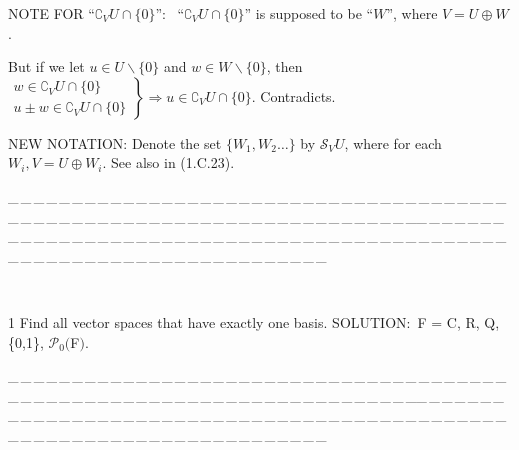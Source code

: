 \documentclass[a4paper, 11pt, UTF8]{article}
\def\Po{\mathcal{P}}
\begin{document}
\begin{large}
{\timesbf\Large N{\normalsize OTE} F{\normalsize OR} $“\complement_V U \cap \{0\}”$:}\,\,\,
$“\complement_V U \cap \{0\}”$ is supposed to be “$W$”, where $V=U\oplus W$.\par\quad
But if we let $u\in U\backslash\{0\}$ and $w\in W\backslash\{0\}$, then $\left.\begin{array}{l} w\in\complement_V U \cap \{0\}\\ u\pm w\in\complement_V U \cap \{0\} \end{array}\right\}\Rightarrow u\in\complement_V U \cap \{0\}.$ Contradicts.\par
{\timesbf\Large N{\normalsize EW} N{\normalsize OTATION:}} {\Large Denote the set $\{W_1,W_2\dots\}$ by $\mathcal{S}_V U$,} {\small where for each $W_i,V=U\oplus W_i$. See also in (1.C.23).}\par{\tiny \_\,\_\,\_\,\_\,\_\,\_\,\_\,\_\,\_\,\_\,\_\,\_\,\_\,\_\,\_\,\_\,\_\,\_\,\_\,\_\,\_\,\_\,\_\,\_\,\_\,\_\,\_\,\_\,\_\,\_\,\_\,\_\,\_\,\_\,\_\,\_\,\_\,\_\,\_\,\_\,\_\,\_\,\_\,\_\,\_\,\_\,\_\,\_\,\_\,\_\,\_\,\_\,\_\,\_\,\_\,\_\,\_\,\_\,\_\,\_\,\_\,\_\,\_\,\_\,\_\,\_\,\_\,\_\,\_\,\_\,\_\_\,\_\,\_\,\_\,\_\,\_\,\_\,\_\,\_\,\_\,\_\,\_\,\_\,\_\,\_\,\_\,\_\,\_\,\_\,\_\,\_\,\_\,\_\,\_\,\_\,\_\,\_\,\_\,\_\,\_\,\_\,\_\,\_\,\_\,\_\,\_\,\_\,\_\,\_\,\_\,\_\,\_\,\_\,\_\,\_\,\_\,\_\,\_\,\_\,\_\,\_\,\_\,\_\,\_\,\_\,\_\,\_\,\_\,\_\,\_\,\_\,\_\,\_\,\_\,\_\,\_\,\_\,\_\,\_\,\_\,\_}{\tiny\,\par}

{\timesbf\Large 1} {\timessl\Large 
Find all vector spaces that have exactly one basis.
}
{\timesbf S\footnotesize{OLUTION:}}\,\,\,{\timesbf F} = {\timesbf C, R, Q},\{0,1\}, $\Po_0(${\timesbf F}$)$.\par
{\tiny \_\,\_\,\_\,\_\,\_\,\_\,\_\,\_\,\_\,\_\,\_\,\_\,\_\,\_\,\_\,\_\,\_\,\_\,\_\,\_\,\_\,\_\,\_\,\_\,\_\,\_\,\_\,\_\,\_\,\_\,\_\,\_\,\_\,\_\,\_\,\_\,\_\,\_\,\_\,\_\,\_\,\_\,\_\,\_\,\_\,\_\,\_\,\_\,\_\,\_\,\_\,\_\,\_\,\_\,\_\,\_\,\_\,\_\,\_\,\_\,\_\,\_\,\_\,\_\,\_\,\_\,\_\,\_\,\_\,\_\,\_\_\,\_\,\_\,\_\,\_\,\_\,\_\,\_\,\_\,\_\,\_\,\_\,\_\,\_\,\_\,\_\,\_\,\_\,\_\,\_\,\_\,\_\,\_\,\_\,\_\,\_\,\_\,\_\,\_\,\_\,\_\,\_\,\_\,\_\,\_\,\_\,\_\,\_\,\_\,\_\,\_\,\_\,\_\,\_\,\_\,\_\,\_\,\_\,\_\,\_\,\_\,\_\,\_\,\_\,\_\,\_\,\_\,\_\,\_\,\_\,\_\,\_\,\_\,\_\,\_\,\_\,\_\,\_\,\_\,\_\,\_}{\tiny\,\par}


\end{large}
\end{document}
